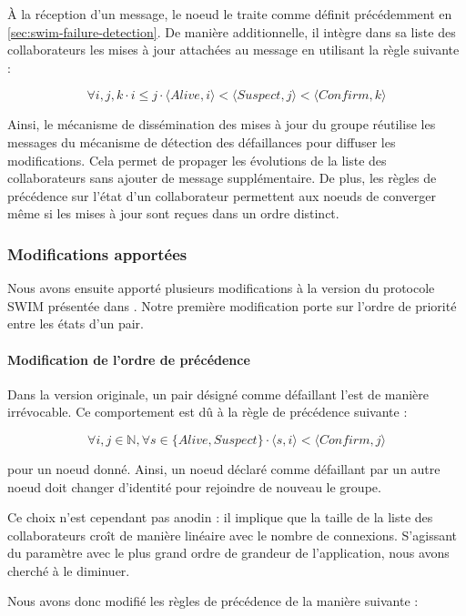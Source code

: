 \documentclass[12pt]{thesul}
\newcommand{\trm}[1]{\mathit{#1}}
\begin{document}
À la réception d'un message, le noeud le traite comme définit précédemment en \autoref{sec:swim-failure-detection}.
De manière additionnelle, il intègre dans sa liste des collaborateurs les mises à jour attachées au message en utilisant la règle suivante :

\[\forall i,j,k \cdot i \leq j \cdot \langle \trm{Alive},i \rangle < \langle \trm{Suspect},j \rangle < \langle \trm{Confirm},k \rangle \]

Ainsi, le mécanisme de dissémination des mises à jour du groupe réutilise les messages du mécanisme de détection des défaillances pour diffuser les modifications.
Cela permet de propager les évolutions de la liste des collaborateurs sans ajouter de message supplémentaire.
De plus, les règles de précédence sur l'état d'un collaborateur permettent aux noeuds de converger même si les mises à jour sont reçues dans un ordre distinct.

\subsubsection{Modifications apportées}

Nous avons ensuite apporté plusieurs modifications à la version du protocole SWIM présentée dans \cite{swim2002}.
Notre première modification porte sur l'ordre de priorité entre les états d'un pair.

\paragraph{Modification de l'ordre de précédence}

Dans la version originale, un pair désigné comme défaillant l'est de manière irrévocable.
Ce comportement est dû à la règle de précédence suivante :

\[\forall i,j \in \mathbb{N}, \forall s \in \{\trm{Alive}, \trm{Suspect}\} \cdot \langle s,i \rangle < \langle \trm{Confirm},j \rangle\]

pour un noeud donné.
Ainsi, un noeud déclaré comme défaillant par un autre noeud doit changer d'identité pour rejoindre de nouveau le groupe.

Ce choix n'est cependant pas anodin : il implique que la taille de la liste des collaborateurs croît de manière linéaire avec le nombre de connexions.
S'agissant du paramètre avec le plus grand ordre de grandeur de l'application, nous avons cherché à le diminuer.

Nous avons donc modifié les règles de précédence de la manière suivante :
\end{document}
